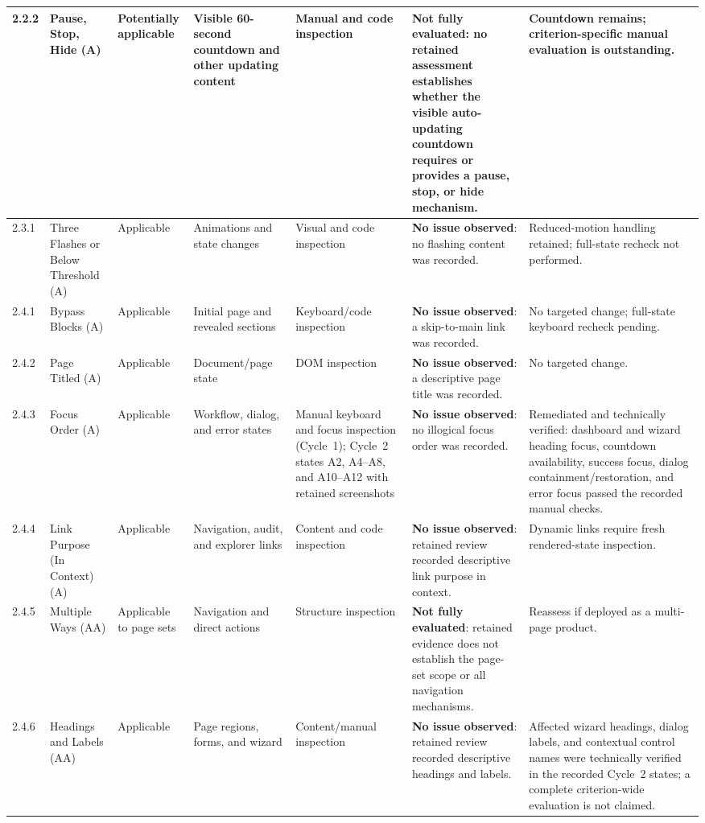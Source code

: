 \documentclass[10pt]{article}
\begin{document}
\begin{landscape}
{\begin{longtable}{|p{1.0cm}|p{3.3cm}|p{1.9cm}|p{2.7cm}|p{2.5cm}|p{4.1cm}|p{4.1cm}|}
2.2.2 & Pause, Stop, Hide (A) & Potentially applicable & Visible 60-second countdown and other updating content & Manual and code inspection & \textbf{Not fully evaluated}: no retained assessment establishes whether the visible auto-updating countdown requires or provides a pause, stop, or hide mechanism. & Countdown remains; criterion-specific manual evaluation is outstanding.\\\hline
2.3.1 & Three Flashes or Below Threshold (A) & Applicable & Animations and state changes & Visual and code inspection & \textbf{No issue observed}: no flashing content was recorded. & Reduced-motion handling retained; full-state recheck not performed.\\\hline
2.4.1 & Bypass Blocks (A) & Applicable & Initial page and revealed sections & Keyboard/code inspection & \textbf{No issue observed}: a skip-to-main link was recorded. & No targeted change; full-state keyboard recheck pending.\\\hline
2.4.2 & Page Titled (A) & Applicable & Document/page state & DOM inspection & \textbf{No issue observed}: a descriptive page title was recorded. & No targeted change.\\\hline
2.4.3 & Focus Order (A) & Applicable & Workflow, dialog, and error states & Manual keyboard and focus inspection (Cycle~1); Cycle~2 states A2, A4--A8, and A10--A12 with retained screenshots & \textbf{No issue observed}: no illogical focus order was recorded. & Remediated and technically verified: dashboard and wizard heading focus, countdown availability, success focus, dialog containment/restoration, and error focus passed the recorded manual checks.\\\hline
2.4.4 & Link Purpose (In Context) (A) & Applicable & Navigation, audit, and explorer links & Content and code inspection & \textbf{No issue observed}: retained review recorded descriptive link purpose in context. & Dynamic links require fresh rendered-state inspection.\\\hline
2.4.5 & Multiple Ways (AA) & Applicable to page sets & Navigation and direct actions & Structure inspection & \textbf{Not fully evaluated}: retained evidence does not establish the page-set scope or all navigation mechanisms. & Reassess if deployed as a multi-page product.\\\hline
2.4.6 & Headings and Labels (AA) & Applicable & Page regions, forms, and wizard & Content/manual inspection & \textbf{No issue observed}: retained review recorded descriptive headings and labels. & Affected wizard headings, dialog labels, and contextual control names were technically verified in the recorded Cycle~2 states; a complete criterion-wide evaluation is not claimed.\\\hline

\end{longtable}}
\end{landscape}
\end{document}
